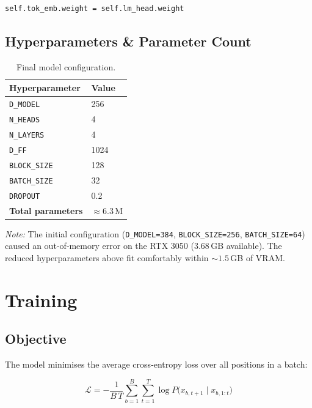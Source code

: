 \documentclass[12pt, a4paper]{article}
\begin{document}
\begin{lstlisting}
self.tok_emb.weight = self.lm_head.weight
\end{lstlisting}

\subsection{Hyperparameters \& Parameter Count}

\begin{table}[H]
  \centering
  \begin{tabular}{ll}
    \toprule
    \textbf{Hyperparameter} & \textbf{Value} \\
    \midrule
    \texttt{D\_MODEL}   & 256 \\
    \texttt{N\_HEADS}   & 4   \\
    \texttt{N\_LAYERS}  & 4   \\
    \texttt{D\_FF}      & 1024 \\
    \texttt{BLOCK\_SIZE}& 128 \\
    \texttt{BATCH\_SIZE}& 32  \\
    \texttt{DROPOUT}    & 0.2 \\
    \textbf{Total parameters} & $\approx 6.3$ M \\
    \bottomrule
  \end{tabular}
  \caption{Final model configuration.}
\end{table}

\noindent\textit{Note:} The initial configuration (\texttt{D\_MODEL=384}, \texttt{BLOCK\_SIZE=256}, \texttt{BATCH\_SIZE=64}) caused an out‑of‑memory error on the RTX 3050 (3.68 GB available). The reduced hyperparameters above fit comfortably within $\sim 1.5$ GB of VRAM.

\section{Training}

\subsection{Objective}
The model minimises the average cross‑entropy loss over all positions in a batch:

\[
  \mathcal{L} = -\frac{1}{B\,T} \sum_{b=1}^{B}\sum_{t=1}^{T}
                \log P\bigl(x_{b,t+1} \mid x_{b,1:t}\bigr)
\]
\end{document}
